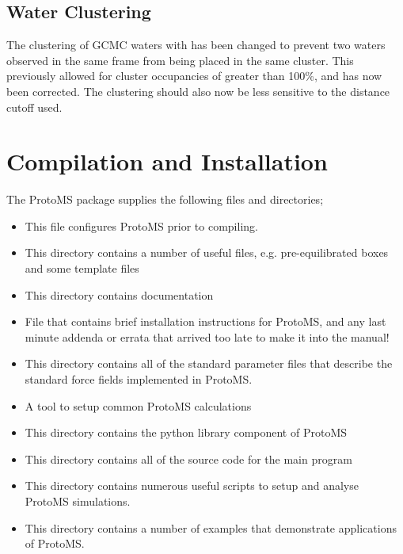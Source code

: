 \documentclass[letterpaper,10pt,english]{sphinxmanual}
\begin{document}
\section{Water Clustering}
\label{\detokenize{changelog:water-clustering}}
The clustering of GCMC waters with  has been changed to prevent two waters observed in the same frame from being placed in the same cluster. This previously allowed for cluster occupancies of greater than 100\%, and has now been corrected. The clustering should also now be less sensitive to the distance cutoff used.


\chapter{Compilation and Installation}
\label{\detokenize{compilation:compilation-and-installation}}\label{\detokenize{compilation::doc}}
The ProtoMS package supplies the following files and directories;
\begin{itemize}
\item {} 
 This file configures ProtoMS prior to compiling.

\item {} 
 This directory contains a number of useful files, e.g. pre-equilibrated boxes and some template files

\item {} 
 This directory contains documentation

\item {} 
 File that contains brief installation instructions for ProtoMS, and any last minute addenda or errata that arrived too late to make it into the manual!

\item {} 
 This directory contains all of the standard parameter files that describe the standard force fields implemented in ProtoMS.

\item {} 
 A tool to setup common ProtoMS calculations

\item {} 
 This directory contains the python library component of ProtoMS

\item {} 
 This directory contains all of the source code for the main program

\item {} 
 This directory contains numerous useful scripts to setup and analyse ProtoMS simulations.

\item {} 
 This directory contains a number of examples that demonstrate applications of ProtoMS.

\end{itemize}
\end{document}
